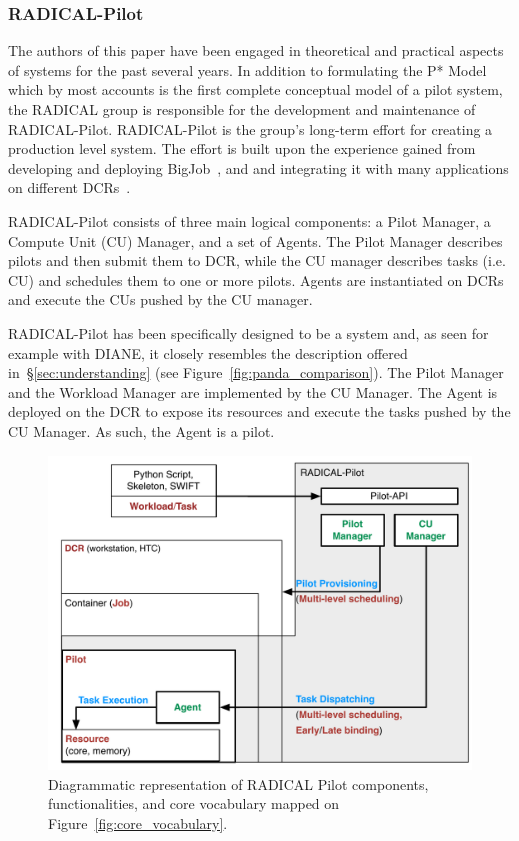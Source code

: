 \documentclass{sig-alternate}
\begin{document}
%
\subsubsection{RADICAL-Pilot}
\label{sec:radical_pilot}

The authors of this paper have been engaged in theoretical and practical aspects
of \pilot systems for the past several years. In addition to formulating the P*
Model~\cite{luckow2012} which by most accounts is the first complete conceptual
model of a pilot system, the RADICAL group is responsible for the development
and maintenance of RADICAL-Pilot\cite{rp-paper2015,rp_url}. RADICAL-Pilot is the
group's long-term effort for creating a production level \pilot system. The
effort is built upon the experience gained from developing and deploying
BigJob~\cite{luckow2010}, and and integrating it with many applications on
different DCRs~\cite{x,y,z}.

RADICAL-Pilot consists of three main logical components: a Pilot Manager, a Compute Unit
(CU) Manager, and a set of Agents. The Pilot Manager describes pilots and then
submit them to DCR, while the CU manager describes tasks (i.e. CU) and schedules
them to one or more pilots. Agents are instantiated on DCRs and execute the CUs
pushed by the CU manager.

RADICAL-Pilot has been specifically designed to be a \pilot system and, as seen
for example with DIANE, it closely resembles the description offered
in~\S\ref{sec:understanding} (see Figure~\ref{fig:panda_comparison}). The Pilot
Manager and the Workload Manager are implemented by the CU Manager. The Agent is
deployed on the DCR to expose its resources and execute the tasks pushed by the
CU Manager. As such, the Agent is a pilot.

\begin{figure}[t]
    \centering
        \includegraphics[width=.48\textwidth]{figures/radicalp_comparison.pdf}
    \caption{Diagrammatic representation of RADICAL Pilot components,
    functionalities, and core vocabulary mapped on
    Figure~\ref{fig:core_vocabulary}.}
    \label{fig:rp_comparison}
\end{figure}
\end{document}
